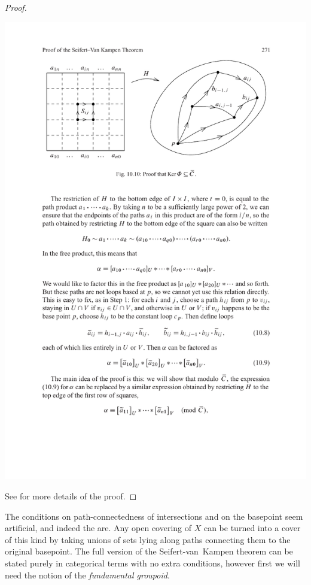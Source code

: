 \begin{proof}
    \begin{center}
        \includegraphics[scale=1]{figures/kernel of Phi.pdf}
    \end{center}
    
    See \cite[Thm.~1.20]{Hatcher} for more details of the proof.
\end{proof}

The conditions on path-connectedness of intersections and on the basepoint seem artificial, and indeed the are. Any open covering of $X$ can be turned into a cover of this kind by taking unions of sets lying along paths connecting them to the original basepoint. The full version of the Seifert-van~Kampen theorem can be stated purely in categorical terms with no extra conditions, however first we will need the notion of the \emph{fundamental groupoid}.

